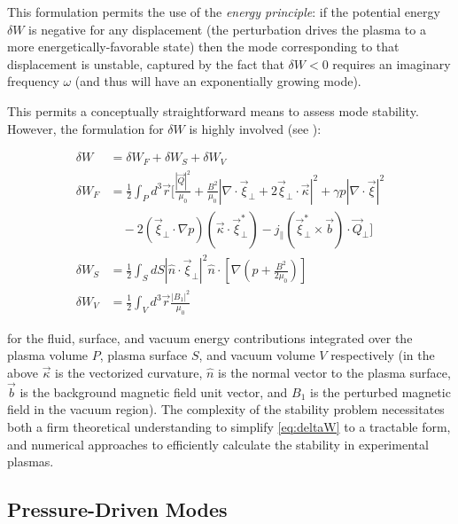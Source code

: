 \noindent This formulation permits the use of the \emph{energy principle}: if the potential energy $\delta W$ is negative for any displacement (\ie the perturbation drives the plasma to a more energetically-favorable state) then the mode corresponding to that displacement is unstable, captured by the fact that $\delta W < 0$ requires an imaginary frequency $\omega$ (and thus will have an exponentially growing mode).  

This permits a conceptually straightforward means to assess mode stability.  However, the formulation for $\delta W$ is highly involved (see \cite[\S 8.8]{Freidberg1987}):

\begin{equation}\label{eq:deltaW}
 \begin{aligned}
  \delta W &= \delta W_F + \delta W_S + \delta W_V\\
  \delta W_F &= \frac{1}{2} \int_P d^3 \vec{r} \Bigg[ \frac{|\vec{Q}|^2}{\mu_0} + \frac{B^2}{\mu_0} \left| \nabla \cdot \vec{\xi}_\perp + 2 \vec{\xi}_\perp \cdot \vec{\kappa} \right|^2 + \gamma p \left| \nabla \cdot \vec{\xi} \right|^2\\
  &\quad- 2\left( \vec{\xi}_\perp \cdot \nabla p \right) \left(\vec{\kappa} \cdot \vec{\xi}_\perp^* \right) - j_\parallel \left(\vec{\xi}_\perp^* \times \vec{b} \right) \cdot \vec{Q}_\perp \Bigg]\\
  \delta W_S &= \frac{1}{2} \int_S dS \left| \hat{n} \cdot \vec{\xi}_\perp \right|^2 \hat{n} \cdot \left[ \nabla \left( p + \frac{B^2}{2\mu_0} \right) \right]\\
  \delta W_V &= \frac{1}{2} \int_V d^3 \vec{r} \frac{\left|B_1 \right|^2}{\mu_0}
 \end{aligned}
\end{equation}

\noindent for the fluid, surface, and vacuum energy contributions integrated over the plasma volume $P$, plasma surface $S$, and vacuum volume $V$ respectively (in the above $\vec{\kappa}$ is the vectorized curvature, $\hat{n}$ is the normal vector to the plasma surface, $\vec{b}$ is the background magnetic field unit vector, and $B_1$ is the perturbed magnetic field in the vacuum region).  The complexity of the stability problem necessitates both a firm theoretical understanding to simplify \cref{eq:deltaW} to a tractable form, and numerical approaches to efficiently calculate the stability in experimental plasmas.

\subsection{Pressure-Driven Modes}\label{subsec:mod_balloon}

